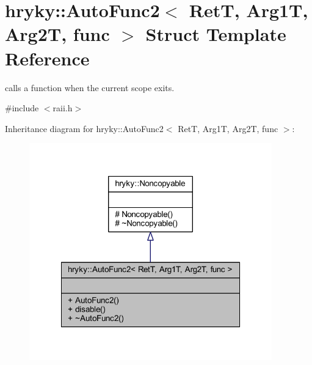 \hypertarget{structhryky_1_1_auto_func2}{\section{hryky\-:\-:Auto\-Func2$<$ Ret\-T, Arg1\-T, Arg2\-T, func $>$ Struct Template Reference}
\label{structhryky_1_1_auto_func2}
}


calls a function when the current scope exits.  




{\ttfamily \#include $<$raii.\-h$>$}



Inheritance diagram for hryky\-:\-:Auto\-Func2$<$ Ret\-T, Arg1\-T, Arg2\-T, func $>$\-:\nopagebreak
\begin{figure}[H]
\begin{center}
\leavevmode
\includegraphics[width=298pt]{structhryky_1_1_auto_func2__inherit__graph}
\end{center}
\end{figure}

